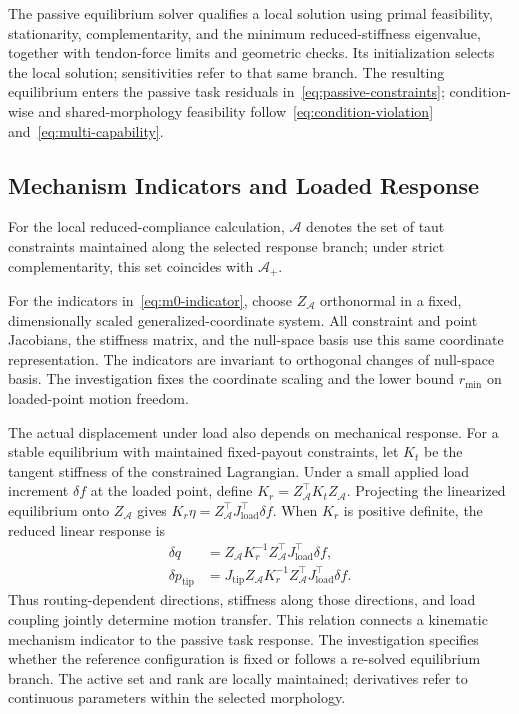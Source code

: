 The passive equilibrium solver qualifies a local solution using primal feasibility, stationarity, complementarity, and the minimum reduced-stiffness eigenvalue, together with tendon-force limits and geometric checks. Its initialization selects the local solution; sensitivities refer to that same branch. The resulting equilibrium enters the passive task residuals in~\eqref{eq:passive-constraints}; condition-wise and shared-morphology feasibility follow~\eqref{eq:condition-violation} and~\eqref{eq:multi-capability}.

\subsection{Mechanism Indicators and Loaded Response}
For the local reduced-compliance calculation, $\mathcal A$ denotes the set of taut constraints maintained along the selected response branch; under strict complementarity, this set coincides with $\mathcal A_+$.

For the indicators in~\eqref{eq:m0-indicator}, choose $Z_{\mathcal A}$ orthonormal in a fixed, dimensionally scaled generalized-coordinate system. All constraint and point Jacobians, the stiffness matrix, and the null-space basis use this same coordinate representation. The indicators are invariant to orthogonal changes of null-space basis. The investigation fixes the coordinate scaling and the lower bound $r_{\min}$ on loaded-point motion freedom.

The actual displacement under load also depends on mechanical response. For a stable equilibrium with maintained fixed-payout constraints, let $K_t$ be the tangent stiffness of the constrained Lagrangian. Under a small applied load increment $\delta f$ at the loaded point, define $K_r=Z_{\mathcal A}^\top K_tZ_{\mathcal A}$. Projecting the linearized equilibrium onto $Z_{\mathcal A}$ gives $K_r\eta=Z_{\mathcal A}^\top J_{\mathrm{load}}^\top\delta f$. When $K_r$ is positive definite, the reduced linear response is
\begin{equation}
\begin{aligned}
\delta q&=Z_{\mathcal A}K_r^{-1}Z_{\mathcal A}^\top J_{\mathrm{load}}^\top\delta f,\\
\delta p_{\mathrm{tip}}&=J_{\mathrm{tip}}Z_{\mathcal A}K_r^{-1}
Z_{\mathcal A}^\top J_{\mathrm{load}}^\top\delta f.
\end{aligned}
\label{eq:reduced-compliance}
\end{equation}
Thus routing-dependent directions, stiffness along those directions, and load coupling jointly determine motion transfer. This relation connects a kinematic mechanism indicator to the passive task response. The investigation specifies whether the reference configuration is fixed or follows a re-solved equilibrium branch. The active set and rank are locally maintained; derivatives refer to continuous parameters within the selected morphology.


